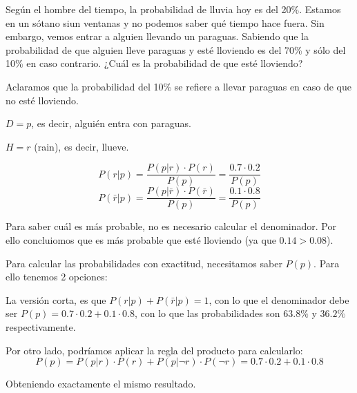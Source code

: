 \begin{problem}[3]

Según el hombre del tiempo, la probabilidad de lluvia hoy es del  20\%. Estamos en un sótano siun ventanas y no podemos saber qué tiempo hace fuera. Sin embargo, vemos entrar a alguien llevando un paraguas. Sabiendo que la probabilidad de que alguien lleve paraguas y esté lloviendo es del 70\% y sólo del 10\% en caso contrario. ¿Cuál es la probabilidad de que esté lloviendo?

\solution 

Aclaramos  que la probabilidad del 10\% se refiere a llevar paraguas en caso de que no esté lloviendo.


$D = p$, es decir, alguién entra con paraguas.

$H = r$ (rain), es decir, llueve.

\[P(r|p) = \frac{P(p|r)·P(r)}{P(p)} = \frac{0.7·0.2}{P(p)} \]
\[P(\bar{r}|p) = \frac{P(p|\bar{r})·P(\bar{r})}{P(p)} = \frac{0.1·0.8}{P(p)} \]

Para saber cuál es más probable, no es necesario calcular el denominador. Por ello concluiomos que es más probable que esté lloviendo (ya que $0.14 > 0.08$).



Para calcular las probabilidades con exactitud, necesitamos saber $P(p)$. Para ello tenemos 2 opciones:

La versión corta, es que $P(r|p) + P(\bar{r}|p) = 1$, con lo que el denominador debe ser $P(p) = 0.7·0.2 + 0.1·0.8$, con lo que las probabilidades son $63.8\%$ y $36.2\%$ respectivamente.

Por otro lado, podríamos aplicar la regla del producto para calcularlo:
\[
P(p) = P(p|r)·P(r) + P(p|\neg r)·P(\neg r) = 0.7·0.2 + 0.1·0.8  
\]

Obteniendo exactamente el mismo resultado.


\end{problem}


